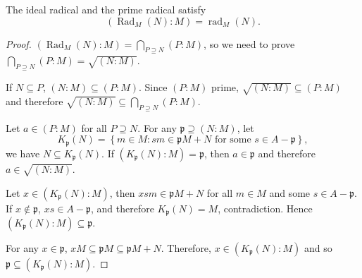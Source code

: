 \begin{proposition*}
	The ideal radical and the prime radical satisfy
	\begin{equation*}
		\left(\operatorname{Rad}_M(N):M\right)=\operatorname{rad}_M(N).
	\end{equation*}
	\begin{proof}
		$\left(\operatorname{Rad}_M(N):M\right)=\bigcap_{P\supseteq N}(P:M)$, so we need to prove $\bigcap_{P\supseteq N}(P:M)=\sqrt{(N:M)}$.
		
		If $N\subseteq P$, $(N:M)\subseteq(P:M)$. Since $(P:M)$ prime, $\sqrt{(N:M)}\subseteq(P:M)$ and therefore $\sqrt{(N:M)}\subseteq\bigcap_{P\supseteq N}(P:M)$.
		
		Let $a\in(P:M)$ for all $P\supseteq N$. For any $\mathfrak{p}\supseteq(N:M)$, let
		\begin{equation*}
			K_\mathfrak{p}(N)=\left\{m\in M:sm\in\mathfrak{p}M+N\text{ for some }s\in A-\mathfrak{p}\right\},
		\end{equation*}
		we have $N\subseteq K_\mathfrak{p}(N)$. If $(K_\mathfrak{p}(N):M)=\mathfrak{p}$, then $a\in\mathfrak{p}$ and therefore $a\in\sqrt{(N:M)}$.
		
		Let $x\in(K_\mathfrak{p}(N):M)$, then $xsm\in\mathfrak{p}M+N$ for all $m\in M$ and some $s\in A-\mathfrak{p}$. If $x\notin\mathfrak{p}$, $xs\in A-\mathfrak{p}$, and therefore $K_\mathfrak{p}(N)=M$, contradiction. Hence $(K_\mathfrak{p}(N):M)\subseteq\mathfrak{p}$.
		
		For any $x\in\mathfrak{p}$, $xM\subseteq\mathfrak{p}M\subseteq\mathfrak{p}M+N$. Therefore, $x\in(K_\mathfrak{p}(N):M)$ and so $\mathfrak{p}\subseteq(K_\mathfrak{p}(N):M)$.
	\end{proof}
\end{proposition*}

